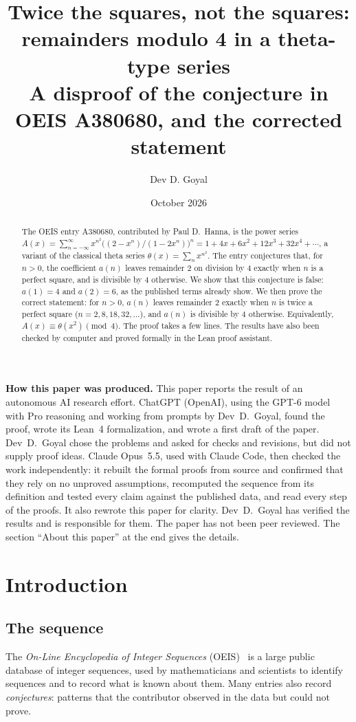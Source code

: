 \documentclass[11pt,a4paper]{article}
\title{Twice the squares, not the squares: remainders modulo 4 in a theta-type series\\[6pt]\large A disproof of the conjecture in OEIS A380680, and the corrected statement}
\author{Dev D. Goyal}
\date{October 2026}
\theoremstyle{definition}
\theoremstyle{remark}
\begin{document}
\maketitle
\begin{abstract}
The OEIS entry A380680, contributed by Paul D.~Hanna, is the power series
$A(x)=\sum_{n=-\infty}^{\infty}x^{n^2}\bigl((2-x^n)/(1-2x^n)\bigr)^n=1+4x+6x^2+12x^3+32x^4+\cdots$, a variant of the
classical theta series $\theta(x)=\sum_nx^{n^2}$. The entry conjectures that, for $n>0$, the coefficient $a(n)$ leaves
remainder $2$ on division by $4$ exactly when $n$ is a perfect square, and is divisible by $4$ otherwise. We show that
this conjecture is false: $a(1)=4$ and $a(2)=6$, as the published terms already show. We then prove the correct
statement: for $n>0$, $a(n)$ leaves remainder $2$ exactly when $n$ is twice a perfect square ($n=2,8,18,32,\dots$),
and $a(n)$ is divisible by $4$ otherwise. Equivalently, $A(x)\equiv\theta(x^2)\pmod 4$. The proof takes a few lines.
The results have also been checked by computer and proved formally in the Lean proof assistant.
\end{abstract}
\begin{center}\begin{minipage}{0.88\linewidth}\small
\textbf{How this paper was produced.} This paper reports the result of an autonomous AI research effort.
ChatGPT (OpenAI), using the GPT-6 model with Pro reasoning and working from prompts by Dev~D.~Goyal, found the proof, wrote its Lean~4 formalization, and wrote a first draft of the paper.
Dev~D.~Goyal chose the problems and asked for checks and revisions, but did not supply proof ideas.
Claude Opus~5.5, used with Claude Code, then checked the work independently: it rebuilt the formal proofs from
source and confirmed that they rely on no unproved assumptions, recomputed the sequence from its definition and tested
every claim against the published data, and read every step of the proofs. It also rewrote this paper for clarity.
Dev~D.~Goyal has verified the results and is responsible for them. The paper has not been peer reviewed.
The section ``About this paper'' at the end gives the details.
\end{minipage}\end{center}

\section{Introduction}

\subsection{The sequence}\label{sec:sequence}
The \emph{On-Line Encyclopedia of Integer Sequences} (OEIS)~\cite{oeisdb} is a large public database of integer
sequences, used by mathematicians and scientists to identify sequences and to record what is known about them. Many
entries also record \emph{conjectures}: patterns that the contributor observed in the data but could not prove.
\end{document}
